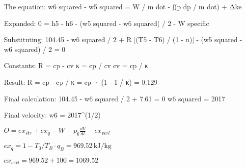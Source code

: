 The equation:  
w6 squared - w5 squared = W / m dot - ∫(p dp / m dot) + Δke  

Expanded:  
0 = h5 - h6 - (w5 squared - w6 squared) / 2 - W specific  

Substituting:  
104.45 - w6 squared / 2 + R [(T5 - T6) / (1 - n)] - (w5 squared - w6 squared) / 2 = 0  

Constants:  
R = cp - cv  
κ = cp / cv  
cv = cp / κ  

Result:  
R = cp - cp / κ = cp · (1 - 1 / κ) = 0.129  

Final calculation:  
104.45 - w6 squared / 2 + 7.61 = 0  
w6 squared = 2017  

Final velocity:  
w6 = 2017^(1/2)

\( O = ex_{str} + ex_q - W - p_0 \frac{dV}{dt} - ex_{verl} \)  

\( ex_q = 1 - T_0 / T_B \cdot q_B = 969.52 \, \text{kJ/kg} \)  

\( ex_{verl} = 969.52 + 100 = 1069.52 \)